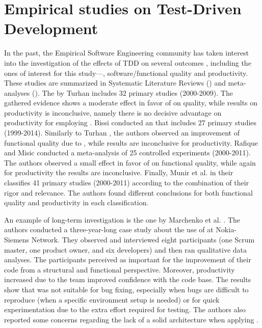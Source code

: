\section{Empirical studies on Test-Driven Development}
In the past, the Empirical Software Engineering community has taken interest into the investigation of the effects of TDD on several outcomes \cite{DBLP:conf/esem/FucciS0SSUTJO16} \cite{DBLP:journals/tse/ErdogmusMT05} \cite{DBLP:journals/infsof/Madeyski10}, including the ones of interest for this study—\ie, software/functional quality and productivity. These studies are summarized in Systematic Literature Reviews (\slrs) and meta-analyses (\eg \cite{DBLP:journals/infsof/BissiNE16, DBLP:journals/infsof/MunirMP14, DBLP:journals/tse/RafiqueM13, TDDEffective}).
The \slr by Turhan \etal \cite{TDDEffective} includes 32 primary studies (2000-2009). The gathered evidence shows a moderate effect in favor of \tdd on quality, while results on productivity is inconclusive, namely there is no decisive advantage on productivity for employing \tdd. Bissi \etal \cite{DBLP:journals/infsof/BissiNE16} conducted an \slr that includes 27 primary studies (1999-2014). 
Similarly to Turhan \etal \cite{TDDEffective}, the authors observed an improvement of functional quality due to \tdd, while results are inconclusive for productivity. Rafique and Misic \cite{DBLP:journals/tse/RafiqueM13} conducted a meta-analysis of 25 controlled experiments (2000-2011). The authors observed a small effect in favor of \tdd on functional quality, while again for productivity the results are inconclusive. 
Finally, Munir et al. \cite{DBLP:journals/infsof/MunirMP14,} in their \slr classifies 41 primary studies (2000-2011) according to the combination of their rigor and relevance. The authors found different conclusions for both functional quality and productivity in each classification.

An example of long-term investigation is the one by Marchenko et al. \cite{DBLP:conf/xpu/MarchenkoAI09}. The authors conducted a three-year-long case study about the use of \tdd at Nokia-Siemens Network. They observed and interviewed eight participants (one Scrum master, one product owner, and six developers) and then ran qualitative data analyses. 
The participants perceived \tdd as important for the improvement of their code from a structural and functional perspective. Moreover, productivity increased due to the team improved confidence with the code base. The results show that \tdd was not suitable for bug fixing, especially when bugs are difficult to reproduce (\eg when a specific environment setup is needed) or for quick experimentation due to the extra effort required for testing. The authors also reported some concerns regarding the lack of a solid architecture when applying \tdd.

